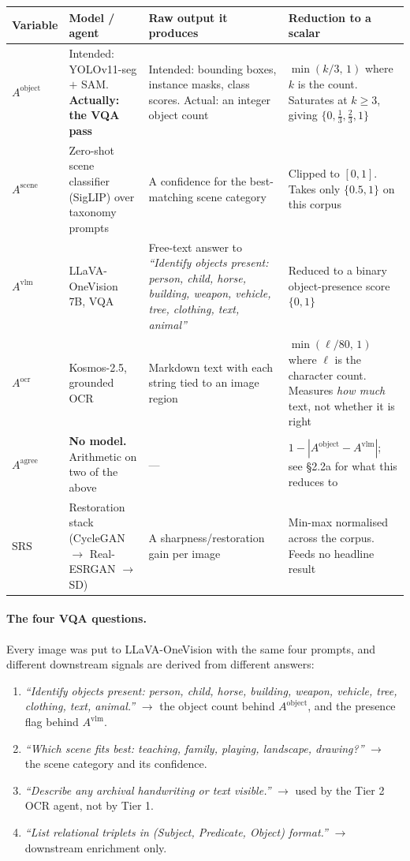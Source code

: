 \documentclass[11pt,a4paper]{article}
\begin{document}
\begin{center}\small
\begin{tabular}{@{}p{1.9cm} p{3.0cm} p{4.3cm} p{4.6cm}@{}}
\toprule
\textbf{Variable} & \textbf{Model / agent} & \textbf{Raw output it produces} & \textbf{Reduction to a scalar} \\
\midrule
$A^{\text{object}}$ &
Intended: YOLOv11-seg $+$ SAM. \textbf{Actually: the VQA pass} &
Intended: bounding boxes, instance masks, class scores. Actual: an integer object count &
$\min(k/3,\,1)$ where $k$ is the count. Saturates at $k\ge3$, giving $\{0,\tfrac13,\tfrac23,1\}$ \\
\addlinespace
$A^{\text{scene}}$ &
Zero-shot scene classifier (SigLIP) over taxonomy prompts &
A confidence for the best-matching scene category &
Clipped to $[0,1]$. Takes only $\{0.5,1\}$ on this corpus \\
\addlinespace
$A^{\text{vlm}}$ &
LLaVA-OneVision 7B, VQA &
Free-text answer to \emph{``Identify objects present: person, child, horse, building, weapon, vehicle, tree, clothing, text, animal''} &
Reduced to a binary object-presence score $\{0,1\}$ \\
\addlinespace
$A^{\text{ocr}}$ &
Kosmos-2.5, grounded OCR &
Markdown text with each string tied to an image region &
$\min(\ell/80,\,1)$ where $\ell$ is the character count. Measures \emph{how much} text, not whether it is right \\
\addlinespace
$A^{\text{agree}}$ &
\textbf{No model.} Arithmetic on two of the above &
--- &
$1-|A^{\text{object}}-A^{\text{vlm}}|$; see \S2.2a for what this reduces to \\
\addlinespace
$\text{SRS}$ &
Restoration stack (CycleGAN $\to$ Real-ESRGAN $\to$ SD) &
A sharpness/restoration gain per image &
Min-max normalised across the corpus. Feeds no headline result \\
\bottomrule
\end{tabular}
\end{center}

\paragraph{The four VQA questions.} Every image was put to LLaVA-OneVision with the same four
prompts, and different downstream signals are derived from different answers:
\begin{enumerate}\itemsep2pt
  \item \emph{``Identify objects present: person, child, horse, building, weapon, vehicle, tree, clothing, text, animal.''} $\rightarrow$ the object count behind $A^{\text{object}}$, and the presence flag behind $A^{\text{vlm}}$.
  \item \emph{``Which scene fits best: teaching, family, playing, landscape, drawing?''} $\rightarrow$ the scene category and its confidence.
  \item \emph{``Describe any archival handwriting or text visible.''} $\rightarrow$ used by the Tier 2 OCR agent, not by Tier 1.
  \item \emph{``List relational triplets in (Subject, Predicate, Object) format.''} $\rightarrow$ downstream enrichment only.
\end{enumerate}
\end{document}
